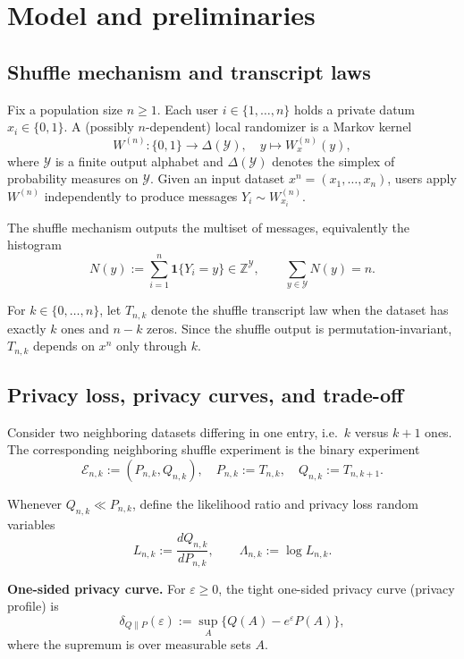 \documentclass{article}
\begin{document}
\section{Model and preliminaries}

\subsection{Shuffle mechanism and transcript laws}

Fix a population size $n \geq 1$. Each user $i \in \{1, \ldots, n\}$ holds a private datum $x_i \in \{0, 1\}$. A (possibly
$n$-dependent) local randomizer is a Markov kernel
\[
W^{(n)}: \{0, 1\} \to \Delta(\mathcal{Y}), \quad y \mapsto W^{(n)}_x(y),
\]
where $\mathcal{Y}$ is a finite output alphabet and $\Delta(\mathcal{Y})$ denotes the simplex of probability measures on $\mathcal{Y}$.
Given an input dataset $x^n = (x_1, \ldots, x_n)$, users apply $W^{(n)}$ independently to produce messages
$Y_i \sim W^{(n)}_{x_i}$.

The shuffle mechanism outputs the multiset of messages, equivalently the histogram
\[
N(y) := \sum_{i=1}^n \mathbf{1}\{Y_i = y\} \in \mathbb{Z}^{\mathcal{Y}}, \qquad \sum_{y \in \mathcal{Y}} N(y) = n.
\]

For $k \in \{0, \ldots, n\}$, let $T_{n,k}$ denote the shuffle transcript law when the dataset has exactly $k$ ones and
$n - k$ zeros. Since the shuffle output is permutation-invariant, $T_{n,k}$ depends on $x^n$ only through $k$.

\subsection{Privacy loss, privacy curves, and trade-off}

Consider two neighboring datasets differing in one entry, i.e.\ $k$ versus $k+1$ ones. The corresponding
neighboring shuffle experiment is the binary experiment
\[
\mathcal{E}_{n,k} := (P_{n,k}, Q_{n,k}), \quad P_{n,k} := T_{n,k}, \quad Q_{n,k} := T_{n,k+1}.
\]

Whenever $Q_{n,k} \ll P_{n,k}$, define the likelihood ratio and privacy loss random variables
\[
L_{n,k} := \frac{dQ_{n,k}}{dP_{n,k}}, \qquad \Lambda_{n,k} := \log L_{n,k}.
\]

\textbf{One-sided privacy curve.} For $\varepsilon \geq 0$, the tight one-sided privacy curve (privacy profile) is
\begin{equation}
\delta_{Q\|P}(\varepsilon) := \sup_A \{Q(A) - e^\varepsilon P(A)\}, \label{eq:delta}
\end{equation}
where the supremum is over measurable sets $A$.
\end{document}
